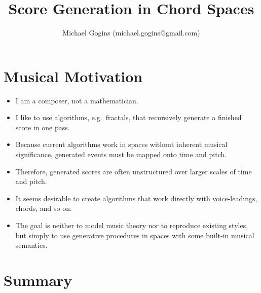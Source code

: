 \documentclass[14pt,letterpaper,onecolumn]{scrartcl}
\begin{document}
\setcounter{tocdepth}{2}
{}

\title{Score Generation in Chord Spaces}
\author{
Michael Gogins  (michael.gogins@gmail.com)
}
\maketitle

\section{Musical Motivation}

\begin{itemize}
	
\item I am a composer, not a mathematician.

\item I like to use algorithms, e.g.\ fractals, that recursively generate a finished score in one pass.

\item Because current algorithms work in spaces without inherent musical significance, generated events must be mapped onto time and pitch.

\item Therefore, generated scores are often unstructured over larger scales of time and pitch.

\item It seems desirable to create algorithms that work directly with voice-leadings, chords, and so on.

\item The goal is neither to model music theory nor to reproduce existing styles, but simply to use generative procedures in spaces with some built-in musical semantics.

\end{itemize}

\section{Summary}
\end{document}
